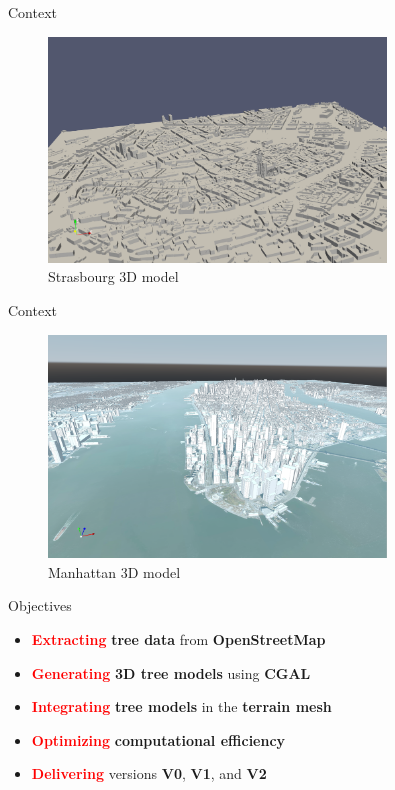 \documentclass[12pt]{beamer}
\begin{document}
\begin{frame}{Context}
\begin{figure}[H]
  \centering
  \includegraphics[width=0.8\textwidth]{images/stras_mesh.png}
  \caption{Strasbourg 3D model}
\end{figure}

\end{frame}

\begin{frame}{Context}
\begin{figure}[H]
  \centering
  \includegraphics[width=0.8\textwidth]{images/manhattan_mesh.png}
  \caption{Manhattan 3D model}
\end{figure}

\end{frame}

\begin{frame}{Objectives}
  \Large
  \begin{itemize}
      \item \textbf{\textcolor{red}{Extracting}} \textbf{tree data} from \textbf{OpenStreetMap}
      \item \textbf{\textcolor{red}{Generating}} \textbf{3D tree models} using \textbf{CGAL}
      \item \textbf{\textcolor{red}{Integrating}} \textbf{tree models} in the \textbf{terrain mesh}
      \item \textbf{\textcolor{red}{Optimizing}} \textbf{computational efficiency}
      \item \textbf{\textcolor{red}{Delivering}} versions \textbf{V0}, \textbf{V1}, and \textbf{V2}
  \end{itemize}
\end{frame}
\end{document}
